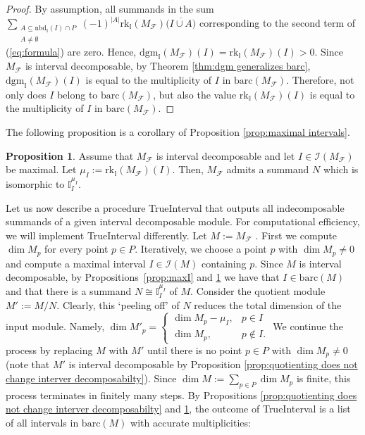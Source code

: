 \documentclass[11pt]{article}
\theoremstyle{definition}
\newtheorem{proposition}[theorem]{Proposition}
\newcommand{\intrk}{\mathrm{rk}_{\mathbb{I}}}
\newcommand{\intdgm}{\mathrm{dgm}_{\mathbb{I}}}
\newcommand{\nbd}{\mathrm{nbd}}
\newcommand{\A}{\mathcal{A}}
\newcommand{\I}{\mathbb{I}}
\newcommand{\Pb}{P}
\newcommand{\Fcal}{\mathcal{F}}
\newcommand{\abs}[1]{\left\lvert{#1}\right\rvert}
\newcommand{\barc}{\mathrm{barc}}
\begin{document}
\begin{proof}
By assumption, all summands in the sum $\displaystyle \sum_{\substack{A\subseteq \nbd_\mathbb{I}(I)\cap P\\A\neq\emptyset}}(-1)^{\abs{A}}\intrk(M_{\mathcal F})\bigg(\overline{I\cup A}\bigg)$ corresponding to the second term  of (\ref{eq:formula}) are zero. Hence, $\intdgm(M_{\mathcal F})(I)=\intrk(M_{\mathcal F})(I)>0$. Since $M_{\mathcal F}$ is interval decomposable, by Theorem \ref{thm:dgm generalizes barc}, $\intdgm(M_{\mathcal F})(I)$ is equal to the multiplicity of $I$ in $\barc(M_{\mathcal F})$. Therefore, not only does $I$ belong to $\barc(M_{\mathcal F})$, but also the value $\intrk(M_{\mathcal F})(I)$ is equal to the multiplicity of $I$ in $\barc(M_{\mathcal F})$. 
\end{proof}




The following proposition is a corollary of Proposition \ref{prop:maximal intervals}. 
\begin{proposition}\label{prop:MaxI}
Assume that $M_\Fcal$ is interval decomposable and let $I\in \mathcal{I}(M_{\Fcal})$ be maximal. Let  $\mu_I:=\intrk(M_{\Fcal})(I)$. Then,
$M_\Fcal$ admits a summand $N$ which is isomorphic to $\I_I^{\mu_I}$. 
\end{proposition}




Let us now describe a procedure {\sc TrueInterval} that outputs all
indecomposable summands of a given interval decomposable module. For computational
efficiency, we will implement {\sc TrueInterval} differently. Let $M:=M_{\mathcal F}$ . First we compute $\dim M_p$ for every
point $p\in \Pb$. Iteratively, we choose a point $p$ with $\dim M_p\not= 0$
and compute a maximal interval $I\in\mathcal{I}(M)$ containing $p$. 
Since $M$ is interval decomposable, by Propositions~\ref{prop:maxI} and \ref{prop:MaxI} we have that $I\in \barc(M)$ and that there is a summand $N\cong \I_{I}^{\mu_I}$ of $M$. Consider the quotient module $M':= M/N$. Clearly, this `peeling off' of
$N$ reduces the total dimension of the input module. Namely,  $\dim M'_p= \begin{cases}
\dim M_p-\mu_I,&p\in I \\ \dim M_p,&p\notin I. \end{cases}$ We
continue the process by replacing $M$ with $M'$ until
there is no point $p\in \Pb$ with $\dim M_p\not = 0$ (note that $M'$ is interval decomposable by Proposition \ref{prop:quotienting does not change interver decomposabilty}). Since $\dim M:=\sum_{p\in \Pb}\dim M_p$ is finite, this process terminates in finitely many steps. By Propositions  \ref{prop:quotienting does not change interver decomposabilty} and \ref{prop:MaxI}, the outcome of {\sc TrueInterval} is a list of all intervals in $\barc(M)$ with
accurate multiplicities: 
\end{document}
